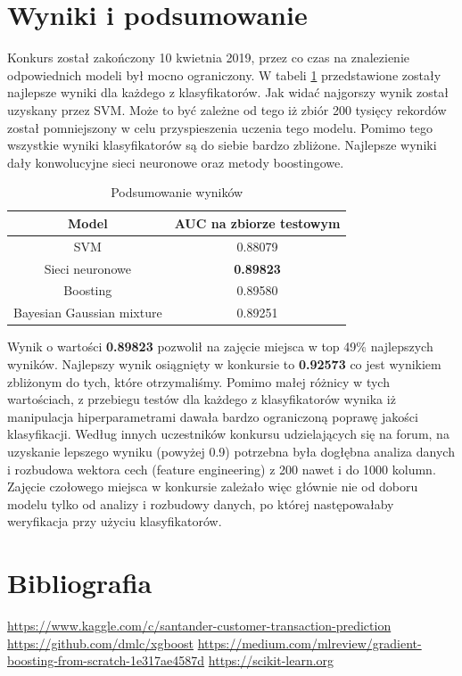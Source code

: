 \documentclass[12pt]{article}
\begin{document}
\newpage

\section{Wyniki i podsumowanie}

Konkurs został zakończony 10 kwietnia 2019, przez co czas na znalezienie odpowiednich modeli był mocno ograniczony. W tabeli \ref{tab:best_scores} przedstawione zostały najlepsze wyniki dla każdego z klasyfikatorów. Jak widać najgorszy wynik został uzyskany przez SVM. Może to być zależne od tego iż zbiór 200 tysięcy rekordów został pomniejszony w celu przyspieszenia uczenia tego modelu. Pomimo tego wszystkie wyniki klasyfikatorów są do siebie bardzo zbliżone. Najlepsze wyniki dały konwolucyjne sieci neuronowe oraz metody boostingowe. 

\begin{table}[h]
    \centering
    \begin{tabular}{|c|c|}
    \hline
        \textbf{Model} & \textbf{AUC na zbiorze testowym} \\ \hline
        SVM & 0.88079 \\ \hline 
        Sieci neuronowe & \textbf{0.89823} \\ \hline 
        Boosting & 0.89580 \\ \hline 
        Bayesian Gaussian mixture & 0.89251 \\ \hline 
    \end{tabular}
    \caption{Podsumowanie wyników}
    \label{tab:best_scores}
\end{table}

Wynik o wartości \textbf{0.89823} pozwolił na zajęcie miejsca w top 49\% najlepszych wyników. Najlepszy wynik osiągnięty w konkursie to \textbf{0.92573} co jest wynikiem zbliżonym do tych, które otrzymaliśmy. Pomimo małej różnicy w tych wartościach, z przebiegu testów dla każdego z klasyfikatorów wynika iż manipulacja hiperparametrami dawała bardzo ograniczoną poprawę jakości klasyfikacji. Według innych uczestników konkursu udzielających się na forum, na uzyskanie lepszego wyniku (powyżej 0.9) potrzebna była dogłębna analiza danych i rozbudowa wektora cech (feature engineering) z 200 nawet i do 1000 kolumn. Zajęcie czołowego miejsca w konkursie zależało więc głównie nie od doboru modelu tylko od analizy i rozbudowy danych, po której następowałaby weryfikacja przy użyciu klasyfikatorów.

\section{Bibliografia}
\begin{thebibliography}{9}

\url{https://www.kaggle.com/c/santander-customer-transaction-prediction}
\url{https://github.com/dmlc/xgboost}
\url{https://medium.com/mlreview/gradient-boosting-from-scratch-1e317ae4587d}
\url{https://scikit-learn.org}

\end{thebibliography}
\end{document}
